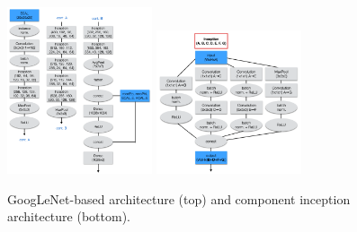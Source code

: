 \begin{figure}[htbp]
\centering
\includegraphics[width=0.38\textwidth]{Images/Calo/GN_architecture.png}
\includegraphics[width=0.38\textwidth]{Images/Calo/inception_architecture.png}
\caption{GoogLeNet-based architecture (top) and component inception architecture (bottom).
}
\label{fig:gn_with_inceptin}
\end{figure}